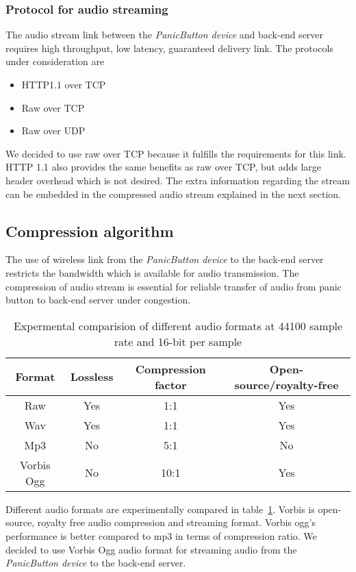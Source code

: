 \subsubsection{Protocol for audio streaming}
The audio stream link between the \emph{PanicButton device} and back-end server requires high throughput, low latency, guaranteed delivery link. The protocols under consideration are
\begin{itemize}
\item HTTP1.1 over TCP
\item Raw over TCP
\item Raw over UDP
\end{itemize}
We decided to use raw over TCP because it fulfills the requirements for this link. HTTP 1.1 also provides the same benefits as raw over TCP, but adds large header overhead which is not desired. The extra information regarding the stream can be embedded in the compressed audio stream explained in the next section.
\subsection{Compression algorithm}
\label{sec:compression}
The use of wireless link from the \emph{PanicButton device} to the back-end server restricts the bandwidth which is available for audio transmission. The compression of audio stream is essential for reliable transfer of audio from panic button to back-end server under congestion.\\

\begin{table}[H]
\begin{center}
\begin{tabular}{ |c|c|c|c| } 
 \hline
 \textbf{Format} & \textbf{Lossless} & \textbf{Compression factor} &\textbf{Open-source/royalty-free} \\
 \hline 
 \hline
 Raw & Yes &  1:1 & Yes\\
  \hline
 Wav & Yes &  1:1 & Yes\\
 \hline
 Mp3 & No &  5:1 & No\\
 \hline
 Vorbis Ogg & No &  10:1 & Yes\\
 \hline
\end{tabular}
\end{center}
\caption{Expermental comparision of different audio formats at 44100 sample rate and 16-bit per sample} \label{tab:audio_formats}
\end{table}
Different audio formats are experimentally compared in table~\ref{tab:audio_formats}. Vorbis is open-source, royalty free audio compression and streaming format. Vorbis ogg's performance is better compared to mp3 in terms of compression ratio. We decided to use Vorbis Ogg audio format for streaming audio from the \emph{PanicButton device} to the back-end server.
